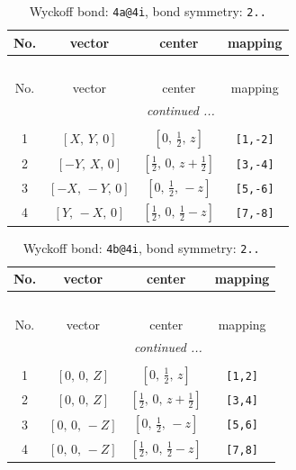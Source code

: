 \documentclass[fleqn,8pt]{jsarticle}
\begin{document}
\begin{longtable}{cccc}
\caption{Wyckoff bond: {\tt 4a@4i}, bond symmetry: {\tt 2..}}
 \\
 \hline \hline
No. & vector & center & mapping \\ \hline \endfirsthead

\multicolumn{3}{l}{\tablename\ \thetable{}} \\
 \hline \hline
No. & vector & center & mapping \\ \hline \endhead

 \hline \hline
\multicolumn{3}{r}{\footnotesize\it continued ...} \\ \endfoot

 \hline \hline
\multicolumn{3}{r}{} \\ \endlastfoot

1 & $\left[ X,\, Y,\, 0 \right]$ & $\left[ 0,\, \frac{1}{2},\, z \right]$ & {\tt [1,-2]} \\ \hline
2 & $\left[ - Y,\, X,\, 0 \right]$ & $\left[ \frac{1}{2},\, 0,\, z + \frac{1}{2} \right]$ & {\tt [3,-4]} \\ \hline
3 & $\left[ - X,\, - Y,\, 0 \right]$ & $\left[ 0,\, \frac{1}{2},\, - z \right]$ & {\tt [5,-6]} \\ \hline
4 & $\left[ Y,\, - X,\, 0 \right]$ & $\left[ \frac{1}{2},\, 0,\, \frac{1}{2} - z \right]$ & {\tt [7,-8]} \\
\end{longtable}
\renewcommand{\arraystretch}{1.2}
\begin{longtable}{cccc}
\caption{Wyckoff bond: {\tt 4b@4i}, bond symmetry: {\tt 2..}}
 \\
 \hline \hline
No. & vector & center & mapping \\ \hline \endfirsthead

\multicolumn{3}{l}{\tablename\ \thetable{}} \\
 \hline \hline
No. & vector & center & mapping \\ \hline \endhead

 \hline \hline
\multicolumn{3}{r}{\footnotesize\it continued ...} \\ \endfoot

 \hline \hline
\multicolumn{3}{r}{} \\ \endlastfoot

1 & $\left[ 0,\, 0,\, Z \right]$ & $\left[ 0,\, \frac{1}{2},\, z \right]$ & {\tt [1,2]} \\ \hline
2 & $\left[ 0,\, 0,\, Z \right]$ & $\left[ \frac{1}{2},\, 0,\, z + \frac{1}{2} \right]$ & {\tt [3,4]} \\ \hline
3 & $\left[ 0,\, 0,\, - Z \right]$ & $\left[ 0,\, \frac{1}{2},\, - z \right]$ & {\tt [5,6]} \\ \hline
4 & $\left[ 0,\, 0,\, - Z \right]$ & $\left[ \frac{1}{2},\, 0,\, \frac{1}{2} - z \right]$ & {\tt [7,8]} \\
\end{longtable}
\end{document}
